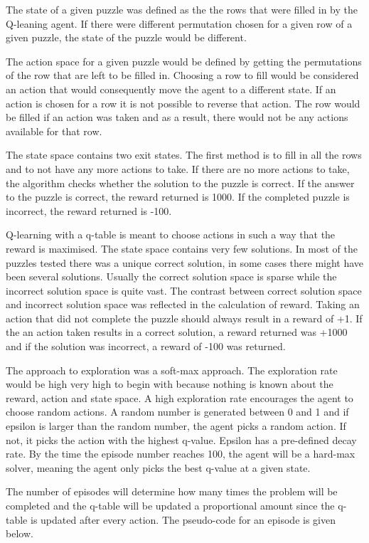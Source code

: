 \documentclass{svproc}
\begin{document}
The state of a given puzzle was defined as the the rows that were filled in by the Q-leaning agent. If there were different permutation chosen for a given row of a given puzzle, the state of the puzzle would be different.

The action space for a given puzzle would be defined by getting the permutations of the row that are left to be filled in. Choosing a row to fill would be considered an action that would consequently move the agent to a different state. If an action is chosen for a row it is not possible to reverse that action. The row would be filled if an action was taken and as a result, there would not be any actions available for that row.

The state space contains two exit states. The first method is to fill in all the rows and to not have any more actions to take. If there are no more actions to take, the algorithm checks whether the solution to the puzzle is correct. If the answer to the puzzle is correct, the reward returned is 1000. If the completed puzzle is incorrect, the reward returned is -100.

Q-learning with a q-table is meant to choose actions in such a way that the reward is maximised. The state space contains very few solutions. In most of the puzzles tested there was a unique correct solution, in some cases there might have been several solutions. Usually the correct solution space is sparse while the incorrect solution space is quite vast. The contrast between correct solution space and incorrect solution space was reflected in the calculation of reward. Taking an action that did not complete the puzzle should always result in a reward of +1. If the an action taken results in a correct solution, a reward returned was +1000 and if the solution was incorrect, a reward of -100 was returned.

The approach to exploration was a soft-max approach. The exploration rate would be high very high to begin with because nothing is known about the reward, action and state space. A high exploration rate encourages the agent to choose random actions. A random number is generated between 0 and 1 and if epsilon is larger than the random number, the agent picks a random action. If not, it picks the action with the highest q-value. Epsilon has a pre-defined decay rate. By the time the episode number reaches 100, the agent will be a hard-max solver, meaning the agent only picks the best q-value at a given state.

The number of episodes will determine how many times the problem will be completed and the q-table will be updated a proportional amount since the q-table is updated after every action. The pseudo-code for an episode is given below.
\end{document}
